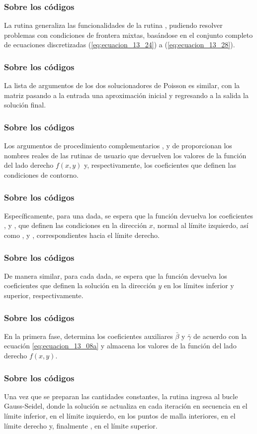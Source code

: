 \begin{frame}
\frametitle{Sobre los códigos}
La rutina  generaliza las funcionalidades de la rutina , pudiendo resolver problemas con condiciones de frontera mixtas, basándose en el conjunto completo de ecuaciones discretizadas (\ref{eq:ecuacion_13_24}) a (\ref{eq:ecuacion_13_28}).
\end{frame}
\begin{frame}
\frametitle{Sobre los códigos}
La lista de argumentos de los dos solucionadores de Poisson es similar, con la matriz  pasando a la entrada una aproximación inicial y regresando a la salida la solución final.
\end{frame}
\begin{frame}
\frametitle{Sobre los códigos}
Los argumentos de procedimiento complementarios ,  y  de  proporcionan los nombres reales de las rutinas de usuario que devuelven los valores de la función del lado derecho $f(x, y)$ y, respectivamente, los coeficientes que definen las condiciones de contorno.
\end{frame}
\begin{frame}
\frametitle{Sobre los códigos}
Específicamente, para una  dada, se espera que la función  devuelva los coeficientes ,  y , que definen las condiciones en la dirección $x$, normal al límite izquierdo, así como ,  y , correspondientes hacia el límite derecho.
\end{frame}
\begin{frame}
\frametitle{Sobre los códigos}
De manera similar, para cada  dada, se espera que la función  devuelva los coeficientes que definen la solución en la dirección $y$ en los límites inferior y superior, respectivamente.
\end{frame}
\begin{frame}
\frametitle{Sobre los códigos}
En la primera fase,  determina los coeficientes auxiliares $\bar{\beta}$ y $\bar{\gamma}$ de acuerdo con la ecuación \ref{eq:ecuacion_13_08a} y almacena los valores de la función del lado derecho $f (x, y)$.
\end{frame}
\begin{frame}
\frametitle{Sobre los códigos}
Una vez que se preparan las cantidades constantes, la rutina ingresa al bucle Gauss-Seidel, donde la solución se actualiza en cada iteración en secuencia en el límite inferior, en el límite izquierdo, en los puntos de malla interiores, en el límite derecho y, finalmente , en el límite superior.
\end{frame}
